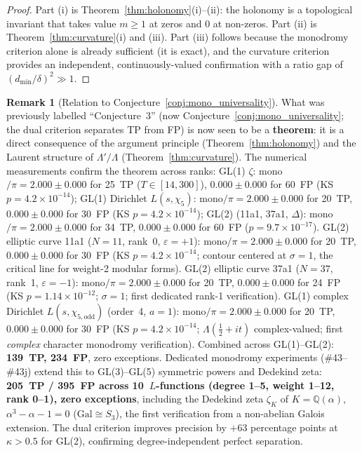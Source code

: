 \documentclass[11pt, a4paper]{article}
\theoremstyle{definition}
\newtheorem{remark}{Remark}[section]
\theoremstyle{plain}
\begin{document}
\begin{proof}
Part (i) is Theorem~\ref{thm:holonomy}(i)--(ii): the holonomy is
a topological invariant that takes value $m \geq 1$ at zeros and $0$
at non-zeros. Part (ii) is Theorem~\ref{thm:curvature}(i) and (iii).
Part (iii) follows because the monodromy criterion alone is already
sufficient (it is exact), and the curvature criterion provides an
independent, continuously-valued confirmation with a ratio gap of
$(d_{\min}/\delta)^2 \gg 1$.
\end{proof}

\begin{remark}[Relation to Conjecture~\ref{conj:mono_universality}]
\label{rem:conj3}
What was previously labelled ``Conjecture~3'' (now Conjecture~\ref{conj:mono_universality}; the dual criterion
separates TP from FP) is now seen to be a \textbf{theorem}: it is
a direct consequence of the argument principle
(Theorem~\ref{thm:holonomy}) and the Laurent structure of
$\Lambda'/\Lambda$ (Theorem~\ref{thm:curvature}). The numerical
measurements confirm the theorem across ranks:
GL(1) $\zeta$: mono$/\pi = 2.000 \pm 0.000$ for 25~TP
($T\in[14,300]$),
$0.000 \pm 0.000$ for 60~FP (KS $p = 4.2 \times 10^{-14}$);
GL(1) Dirichlet $L(s,\chi_5)$: mono$/\pi = 2.000 \pm 0.000$ for
20~TP, $0.000 \pm 0.000$ for 30~FP (KS $p = 4.2 \times 10^{-14}$);
GL(2) (11a1, 37a1, $\Delta$): mono$/\pi = 2.000 \pm 0.000$
for 34~TP, $0.000 \pm 0.000$ for 60~FP
($p = 9.7 \times 10^{-17}$).
GL(2) elliptic curve 11a1 ($N=11$, rank~0, $\varepsilon=+1$): mono$/\pi = 2.000 \pm 0.000$
for 20~TP, $0.000 \pm 0.000$ for 30~FP
(KS $p = 4.2 \times 10^{-14}$; contour centered at $\sigma = 1$, the
critical line for weight-2 modular forms).
GL(2) elliptic curve 37a1 ($N=37$, rank~1, $\varepsilon=-1$): mono$/\pi = 2.000 \pm 0.000$
for 20~TP, $0.000 \pm 0.000$ for 24~FP
(KS $p = 1.14 \times 10^{-12}$; $\sigma = 1$; first dedicated rank-1 verification).
GL(1) complex Dirichlet $L(s,\chi_{5,\mathrm{odd}})$ (order~4, $a=1$):
mono$/\pi = 2.000 \pm 0.000$ for 20~TP, $0.000 \pm 0.000$ for 30~FP
(KS $p = 4.2 \times 10^{-14}$; $\Lambda(\tfrac{1}{2}+it)$ complex-valued;
first \emph{complex} character monodromy verification).
Combined across GL(1)--GL(2): \textbf{139~TP, 234~FP}, zero exceptions.
Dedicated monodromy experiments (\#43--\#43j) extend this to
GL(3)--GL(5) symmetric powers and Dedekind zeta:
\textbf{205~TP / 395~FP across 10~$L$-functions
(degree 1--5, weight 1--12, rank 0--1), zero exceptions},
including the Dedekind zeta $\zeta_K$ of $K = \mathbb{Q}(\alpha)$,
$\alpha^3 - \alpha - 1 = 0$ ($\mathrm{Gal} \cong S_3$),
the first verification from a non-abelian Galois extension.
The dual criterion improves
precision by $+63$ percentage points at $\kappa > 0.5$ for GL(2),
confirming degree-independent perfect separation.
\end{remark}
\end{document}
